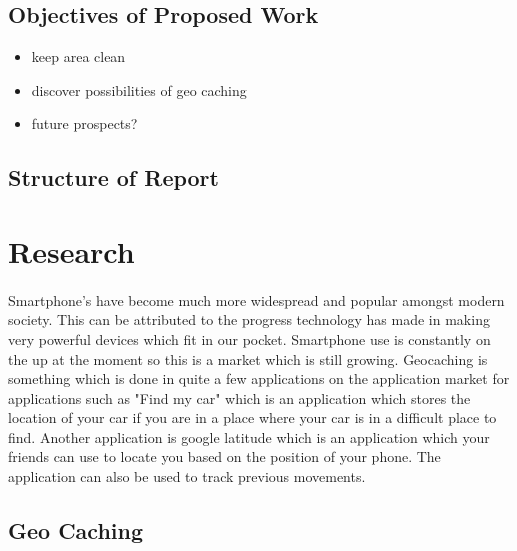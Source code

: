 \documentclass{article}
\begin{document}

\subsection{Objectives of Proposed Work}
\begin{itemize}
\item keep area clean
\item discover possibilities of geo caching
\item future prospects?
\end{itemize}


\subsection{Structure of Report}

\newpage
\label{sec:Motivation}


\section{Research}
\paragraph{}
\label{par:First Paragraph}

Smartphone's have become much more widespread and popular amongst modern society. This can be attributed to the progress technology has made in making very powerful devices which fit in our pocket. Smartphone use is constantly on the up at the moment so this is a market which is still growing. 
Geocaching is something which is done in quite a few applications on the application market for applications such as "Find my car" which is an application which stores the location of your car if you are in a place where your car is in a difficult place to find. Another application is google latitude which is an application which your friends can use to locate you based on the position of your phone. The application can also be used to track previous movements.


\subsection{Geo Caching}

\end{document}
